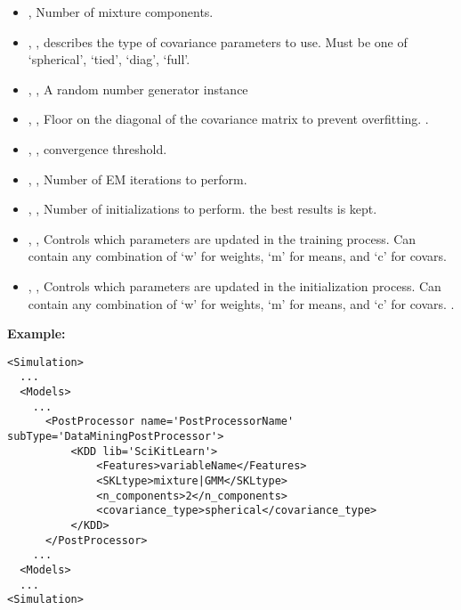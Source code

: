 \begin{itemize}
	\item {},  Number of mixture components. 
	\item {}, , describes the type of covariance parameters to use.
Must be one of ‘spherical’, ‘tied’, ‘diag’, ‘full’. 
	\item {}, ,  A random number
generator instance 
	\item {}, ,
 Floor on the diagonal of the covariance matrix to prevent overfitting.
 .
	\item {}, ,
convergence threshold. 
	\item {}, ,
Number of EM iterations to perform. 
	\item {}, ,
Number of initializations to perform. the best results is kept.
	\item {}, ,
 Controls which parameters are updated in the training process.
Can contain any combination of ‘w’ for weights, ‘m’ for means, and
‘c’ for covars. 
	\item {}, , Controls which parameters are updated in the initialization
process. Can contain any combination of ‘w’ for weights, ‘m’ for means,
 and ‘c’ for covars. .
\end{itemize}

\textbf{Example:}
\begin{lstlisting}[style=XML,morekeywords={subType}]
<Simulation>
  ...
  <Models>
    ...
      <PostProcessor name='PostProcessorName' subType='DataMiningPostProcessor'>
          <KDD lib='SciKitLearn'>
              <Features>variableName</Features>
              <SKLtype>mixture|GMM</SKLtype>
              <n_components>2</n_components>
              <covariance_type>spherical</covariance_type>
          </KDD>
      </PostProcessor>
    ...
  <Models>
  ...
<Simulation>
\end{lstlisting}


